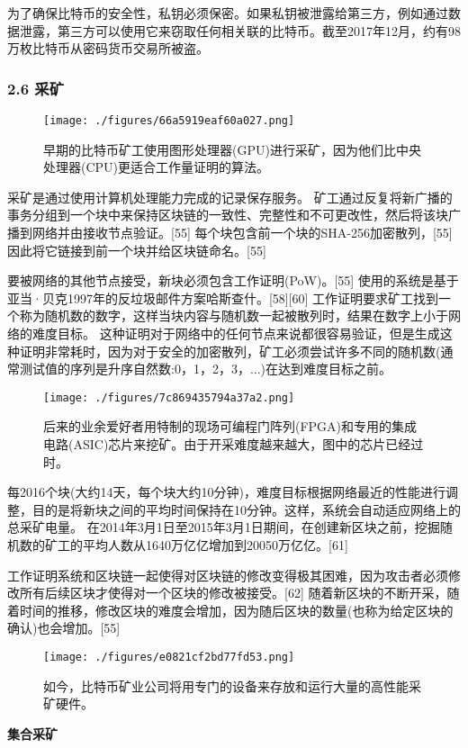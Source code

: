 为了确保比特币的安全性，私钥必须保密。如果私钥被泄露给第三方，例如通过数据泄露，第三方可以使用它来窃取任何相关联的比特币。截至2017年12月，约有98万枚比特币从密码货币交易所被盗。
\subsubsection{2.6 采矿}
\begin{figure}[ht]
\centering
\texttt{[image: ./figures/66a5919eaf60a027.png]}
\caption{早期的比特币矿工使用图形处理器(GPU)进行采矿，因为他们比中央处理器(CPU)更适合工作量证明的算法。} \label{fig_BTC_3}
\end{figure}
采矿是通过使用计算机处理能力完成的记录保存服务。 矿工通过反复将新广播的事务分组到一个块中来保持区块链的一致性、完整性和不可更改性，然后将该块广播到网络并由接收节点验证。[55] 每个块包含前一个块的SHA-256加密散列，[55] 因此将它链接到前一个块并给区块链命名。[55]

要被网络的其他节点接受，新块必须包含工作证明(PoW)。[55] 使用的系统是基于亚当·贝克1997年的反垃圾邮件方案哈斯查什。[58][60] 工作证明要求矿工找到一个称为随机数的数字，这样当块内容与随机数一起被散列时，结果在数字上小于网络的难度目标。 这种证明对于网络中的任何节点来说都很容易验证，但是生成这种证明非常耗时，因为对于安全的加密散列，矿工必须尝试许多不同的随机数(通常测试值的序列是升序自然数:0，1，2，3，...)在达到难度目标之前。
\begin{figure}[ht]
\centering
\texttt{[image: ./figures/7c869435794a37a2.png]}
\caption{后来的业余爱好者用特制的现场可编程门阵列(FPGA)和专用的集成电路(ASIC)芯片来挖矿。由于开采难度越来越大，图中的芯片已经过时。} \label{fig_BTC_4}
\end{figure}
每2016个块(大约14天，每个块大约10分钟)，难度目标根据网络最近的性能进行调整，目的是将新块之间的平均时间保持在10分钟。这样，系统会自动适应网络上的总采矿电量。 在2014年3月1日至2015年3月1日期间，在创建新区块之前，挖掘随机数的矿工的平均人数从1640万亿亿增加到20050万亿亿。[61]

工作证明系统和区块链一起使得对区块链的修改变得极其困难，因为攻击者必须修改所有后续区块才使得对一个区块的修改被接受。[62] 随着新区块的不断开采，随着时间的推移，修改区块的难度会增加，因为随后区块的数量(也称为给定区块的确认)也会增加。[55]
\begin{figure}[ht]
\centering
\texttt{[image: ./figures/e0821cf2bd77fd53.png]}
\caption{如今，比特币矿业公司将用专门的设备来存放和运行大量的高性能采矿硬件。} \label{fig_BTC_5}
\end{figure}

\textbf{集合采矿}

